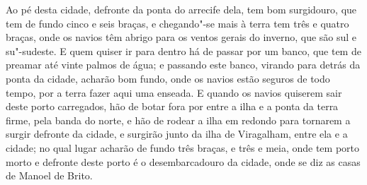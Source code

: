 Ao pé desta cidade, defronte da ponta do arrecife dela, tem bom surgidouro, que tem de
fundo cinco e seis braças, e chegando"-se mais à terra tem três e quatro braças, onde os
navios têm abrigo para os ventos gerais do inverno, que são sul e su"-sudeste. E quem
quiser ir para dentro há de passar por um banco, que tem de preamar até vinte palmos de
água; e passando este banco, virando para detrás da ponta da cidade, acharão bom fundo,
onde os navios estão seguros de todo tempo, por a terra fazer aqui uma enseada. E quando
os navios quiserem sair deste porto carregados, hão de botar fora por entre a ilha e a
ponta da terra firme, pela banda do norte, e hão de rodear a ilha em redondo para tornarem
a surgir defronte da cidade, e surgirão junto da ilha de Viragalham, entre ela e a cidade;
no qual lugar acharão de fundo três braças, e três e meia, onde tem porto morto e defronte
deste porto é o desembarcadouro da cidade, onde se diz as casas de Manoel de Brito.

